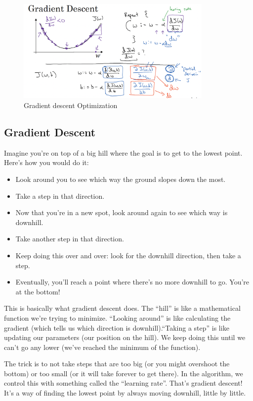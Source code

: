 \documentclass[letterpaper,12pt,notitlepage,twoside]{report}
\begin{document}
\begin{figure}[h]
	\centering
	\includegraphics[width=0.85\textwidth]{Images/Gradient descent.png}
	\caption{Gradient descent Optimization}
	\label{fig:10}
\end{figure}
\FloatBarrier

\subsection{Gradient Descent}
\begin{funfact}
Imagine you're on top of a big hill where the goal is to get to the lowest point.
Here's how you would do it:

\begin{itemize}[nosep]
\item Look around you to see which way the ground slopes down the most. 
\item Take a step in that direction. 
\item Now that you're in a new spot, look around again to see which way is downhill.
\item Take another step in that direction. 
\item Keep doing this over and over: look for the downhill direction, then take a step. 
\item Eventually, you'll reach a point where there's no more downhill to go. You're at the bottom!
\end{itemize}

This is basically what gradient descent does. The ``hill'' is like a mathematical function we're trying to minimize. ``Looking around'' is like calculating the gradient (which tells us which direction is downhill).``Taking a step'' is like updating our parameters (our position on the hill). We keep doing this until we can't go any lower (we've reached the minimum of the function).

The trick is to not take steps that are too big (or you might overshoot the bottom) or too small (or it will take forever to get there). In the algorithm, we control this with something called the ``learning rate''. That's gradient descent! It's a way of finding the lowest point by always moving downhill, little by little.
\end{funfact}
\end{document}
